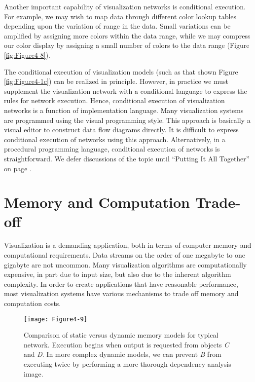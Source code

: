Another important capability of visualization networks is conditional execution. For example, we may wish to map data through different color lookup tables depending upon the variation of range in the data. Small variations can be amplified by assigning more colors within the data range, while we may compress our color display by assigning a small number of colors to the data range (Figure \ref{fig:Figure4-8}). 

The conditional execution of visualization models (such as that shown Figure \ref{fig:Figure4-1c}) can be realized in principle. However, in practice we must supplement the visualization network with a conditional language to express the rules for network execution. Hence, conditional execution of visualization networks is a function of implementation language. Many visualization systems are programmed using the visual programming style. This approach is basically a visual editor to construct data flow diagrams directly. It is difficult to express conditional execution of networks using this approach. Alternatively, in a procedural programming language, conditional execution of networks is straightforward. We defer discussions of the topic until ``Putting It All Together'' on page \pageref{sec:chap04.putting_it_all_together}.

\section{Memory and Computation Trade-off}
\label{sec:memory_computation_trade-off}

Visualization is a demanding application, both in terms of computer memory and computational requirements. Data streams on the order of one megabyte to one gigabyte are not uncommon. Many visualization algorithms are computationally expensive, in part due to input size, but also due to the inherent algorithm complexity. In order to create applications that have reasonable performance, most visualization systems have various mechanisms to trade off memory and computation costs.

\begin{figure}[!htb]
  \centering
  \texttt{[image: Figure4-9]}\\
  \caption{Comparison of static versus dynamic memory models for typical network. Execution begins when output is requested from objects \emph{C} and \emph{D}. In more complex dynamic models, we can prevent \emph{B} from executing twice by performing a more thorough dependency analysis image.}\label{fig:Figure4-9}
\end{figure}

